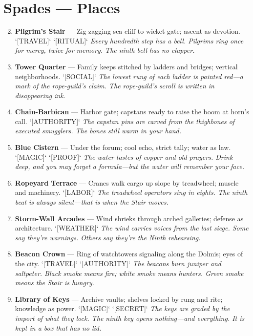 \section*{Spades --- Places}
\label{sec:thepyrgos-places}
\begin{enumerate}
\setcounter{enumi}{1}
\item \textbf{Pilgrim's Stair} --- Zig-zagging sea-cliff to wicket gate; ascent as devotion. `[TRAVEL]` `[RITUAL]`
  \hfill \textit{Every hundredth step has a bell. Pilgrims ring once for mercy, twice for memory. The ninth bell has no clapper.}
\item \textbf{Tower Quarter} --- Family keeps stitched by ladders and bridges; vertical neighborhoods. `[SOCIAL]`
  \hfill \textit{The lowest rung of each ladder is painted red---a mark of the rope-guild's claim. The rope-guild's scroll is written in disappearing ink.}
\item \textbf{Chain-Barbican} --- Harbor gate; capstans ready to raise the boom at horn's call. `[AUTHORITY]`
  \hfill \textit{The capstan pins are carved from the thighbones of executed smugglers. The bones still warm in your hand.}
\item \textbf{Blue Cistern} --- Under the forum; cool echo, strict tally; water as law. `[MAGIC]` `[PROOF]`
  \hfill \textit{The water tastes of copper and old prayers. Drink deep, and you may forget a formula---but the water will remember your face.}
\item \textbf{Ropeyard Terrace} --- Cranes walk cargo up slope by treadwheel; muscle and machinery. `[LABOR]`
  \hfill \textit{The treadwheel operators sing in eights. The ninth beat is always silent---that is when the Stair moves.}
\item \textbf{Storm-Wall Arcades} --- Wind shrieks through arched galleries; defense as architecture. `[WEATHER]`
  \hfill \textit{The wind carries voices from the last siege. Some say they're warnings. Others say they're the Ninth rehearsing.}
\item \textbf{Beacon Crown} --- Ring of watchtowers signaling along the Dolmis; eyes of the city. `[TRAVEL]` `[AUTHORITY]`
  \hfill \textit{The beacons burn juniper and saltpeter. Black smoke means fire; white smoke means hunters. Green smoke means the Stair is hungry.}
\item \textbf{Library of Keys} --- Archive vaults; shelves locked by rung and rite; knowledge as power. `[MAGIC]` `[SECRET]`
  \hfill \textit{The keys are graded by the import of what they lock. The ninth key opens nothing---and everything. It is kept in a box that has no lid.}

\end{enumerate}
